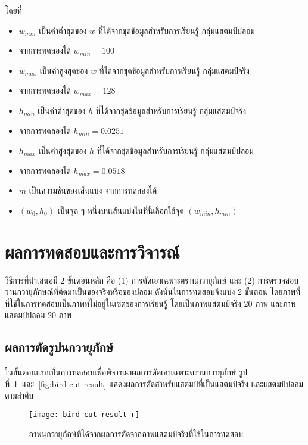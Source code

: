  โดยที่  
 \begin{itemize}
 \item $w_{min}$ เป็นค่าต่ำสุดของ $w$ ที่ได้จากชุดข้อมูลสำหรับการเรียนรู้ กลุ่มแสตมป์ปลอม  
 \item[]จากการทดลองได้ $w_{min} = 100$
 \item $w_{max}$ เป็นค่าสูงสุดของ $w$ ที่ได้จากชุดข้อมูลสำหรับการเรียนรู้ กลุ่มแสตมป์จริง 

 \item[]จากการทดลองได้ $w_{max} = 128$
\item $h_{min}$ เป็นค่าต่ำสุดของ $h$ ที่ได้จากชุดข้อมูลสำหรับการเรียนรู้ กลุ่มแสตมป์จริง 

\item[]จากการทดลองได้ $h_{min} = 0.0251$ 
\item $h_{max}$ เป็นค่าสูงสุดของ $h$ ที่ได้จากชุดข้อมูลสำหรับการเรียนรู้ กลุ่มแสตมป์ปลอม 

\item[]จากการทดลองได้ $h_{max} = 0.0518$ 
\item $m$ เป็นความชันของเส้นแบ่ง จากการทดลองได้
\item $(w_0, h_0)$ เป็นจุด ๆ หนึ่งบนเส้นแบ่งในที่นี้เลือกใช้จุด $(w_{min}, h_{min})$
 \end{itemize}
 

           

\section{ผลการทดสอบและการวิจารณ์}
วิธีการที่นำเสนอมี 2 ขั้นตอนหลัก คือ (1) การตัดเอาเฉพาะตรานกวายุภักษ์ และ (2) การตรวจสอบว่านกวายุภักษณ์ที่ตัดมาเป็นของจริงหรือของปลอม ดังนั้นในการทดสอบจึงแบ่ง 2 ขั้นตอน 
โดยภาพที่ที่ใช้ในการทดสอบเป็นภาพที่ไม่อยู่ในเซตของการเรียนรู้ โดยเป็นภาพแสตมป์จริง 20 ภาพ และภาพแสตมป์ปลอม  20  ภาพ

\subsection{ผลการตัดรูปนกวายุภักษ์} 
 ในขั้นตอนแรกเป็นการทดสอบเพื่อพิจารณาผลการตัดเอาเฉพาะตรานกวายุภักษ์ รูปที่~\ref{fig:bird-cut-result-r}~และ~\ref{fig:bird-cut-result} แสดงผลการตัดสำหรับแสตมป์ที่เป็นแสตมป์จริง และแสตมป์ปลอมตามลำดับ

\begin{figure}[!ht]
\centering
\texttt{[image: bird-cut-result-r]}
\caption{ภาพนกวายุภักษ์ที่ได้จากผลการตัดจากภาพแสตมป์จริงที่ใช้ในการทดสอบ}
\label{fig:bird-cut-result-r}
\end{figure}

